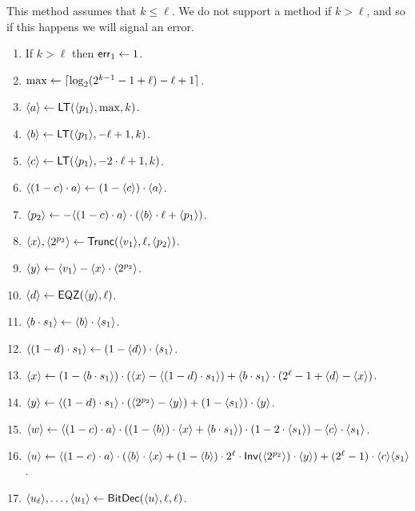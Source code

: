 This method assumes that $k \le \ell$.
We do not support a method if $k > \ell$, and so if this happens
we will signal an error.
\begin{enumerate}
  \item If $k>\ell$ then $\mathsf{err}_1 \leftarrow 1$.
  \item $\max \leftarrow {\lceil \log_2(2^{k-1}-1+\ell)-\ell+1 \rceil}$.
  \item $\langle a \rangle \leftarrow \mathsf{LT}(\langle p_1 \rangle,\max,k)$.
  \item $\langle b \rangle \leftarrow \mathsf{LT}(\langle p_1 \rangle,-\ell+1,k)$.
  \item $\langle c \rangle \leftarrow \mathsf{LT}(\langle p_1 \rangle,-2 \cdot \ell+1,k)$.
  \item $\langle (1-c) \cdot a \rangle \leftarrow (1-\langle c \rangle) \cdot \langle a \rangle$.
  \item $\langle p_2 \rangle \leftarrow -\langle (1-c) \cdot a \rangle \cdot (\langle b \rangle \cdot \ell +\langle p_1 \rangle)$.
  \item $\langle x \rangle,\langle 2^{p_2} \rangle \leftarrow \mathsf{Trunc}(\langle v_1 \rangle,\ell,\langle p_2 \rangle)$.
  \item $\langle y \rangle \leftarrow \langle v_1 \rangle-\langle x \rangle \cdot \langle 2^{p_2} \rangle$.
  \item $\langle d \rangle \leftarrow \mathsf{EQZ}(\langle y \rangle,\ell)$.
  \item $\langle b \cdot s_1 \rangle \leftarrow \langle b \rangle \cdot \langle s_1 \rangle$.
  \item $\langle (1-d) \cdot s_1 \rangle \leftarrow (1-\langle d \rangle) \cdot \langle s_1 \rangle$.
  \item $\langle x \rangle \leftarrow (1-\langle b \cdot s_1 \rangle)
          \cdot (\langle x \rangle-\langle (1-d)\cdot s_1 \rangle)
          +\langle b \cdot s_1 \rangle \cdot(2^\ell-1+\langle d \rangle-\langle x \rangle)$.
  \item $\langle y \rangle \leftarrow \langle (1-d) \cdot s_1 \rangle \cdot (\langle 2^{p_2} \rangle-\langle y \rangle)
          + (1-\langle s_1 \rangle)\cdot \langle y \rangle$.
  \item $\langle w \rangle \leftarrow \langle (1-c) \cdot a \rangle \cdot
          ((1-\langle b \rangle) \cdot\langle x \rangle+\langle b \cdot s_1 \rangle)
          \cdot (1-2\cdot \langle s_1 \rangle)-\langle c \rangle \cdot \langle s_1 \rangle$.
  \item $\langle u \rangle \leftarrow \langle (1-c) \cdot a \rangle
          \cdot (\langle b \rangle \cdot \langle x \rangle
          +(1-\langle b \rangle) \cdot 2^\ell \cdot \mathsf{Inv}(\langle 2^{p_2} \rangle)
          \cdot \langle y \rangle)
          +(2^\ell-1)\cdot \langle c \rangle \langle s_1 \rangle$.
  \item $\langle u_\ell \rangle,\ldots,\langle u_1 \rangle \leftarrow \mathsf{BitDec}(\langle u \rangle,\ell,\ell)$.

\end{enumerate}
